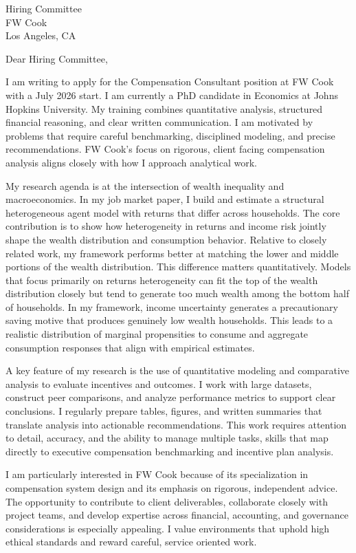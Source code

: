 \documentclass[11pt]{letter}
\begin{document}
\begin{letter}{Hiring Committee \\ FW Cook \\ Los Angeles, CA}

\opening{Dear Hiring Committee,}

I am writing to apply for the Compensation Consultant position at FW Cook with a July 2026 start. I am currently a PhD candidate in Economics at Johns Hopkins University. My training combines quantitative analysis, structured financial reasoning, and clear written communication. I am motivated by problems that require careful benchmarking, disciplined modeling, and precise recommendations. FW Cook’s focus on rigorous, client facing compensation analysis aligns closely with how I approach analytical work.

My research agenda is at the intersection of wealth inequality and macroeconomics. In my job market paper, I build and estimate a structural heterogeneous agent model with returns that differ across households. The core contribution is to show how heterogeneity in returns and income risk jointly shape the wealth distribution and consumption behavior. Relative to closely related work, my framework performs better at matching the lower and middle portions of the wealth distribution. This difference matters quantitatively. Models that focus primarily on returns heterogeneity can fit the top of the wealth distribution closely but tend to generate too much wealth among the bottom half of households. In my framework, income uncertainty generates a precautionary saving motive that produces genuinely low wealth households. This leads to a realistic distribution of marginal propensities to consume and aggregate consumption responses that align with empirical estimates.

A key feature of my research is the use of quantitative modeling and comparative analysis to evaluate incentives and outcomes. I work with large datasets, construct peer comparisons, and analyze performance metrics to support clear conclusions. I regularly prepare tables, figures, and written summaries that translate analysis into actionable recommendations. This work requires attention to detail, accuracy, and the ability to manage multiple tasks, skills that map directly to executive compensation benchmarking and incentive plan analysis.

I am particularly interested in FW Cook because of its specialization in compensation system design and its emphasis on rigorous, independent advice. The opportunity to contribute to client deliverables, collaborate closely with project teams, and develop expertise across financial, accounting, and governance considerations is especially appealing. I value environments that uphold high ethical standards and reward careful, service oriented work.


\end{letter}
\end{document}
